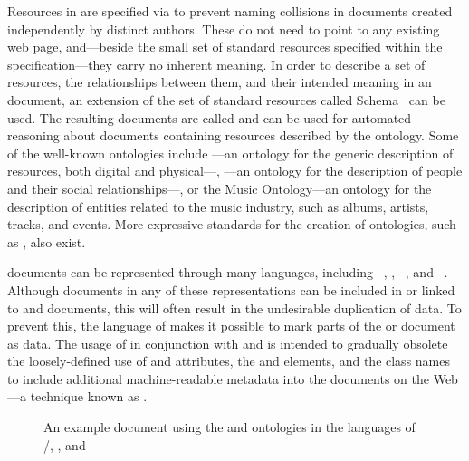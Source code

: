 Resources in  are specified via  to prevent naming
collisions in  documents created independently by distinct authors.
These  do not need to point to any existing web page, and---beside
the small set of standard resources specified within the 
specification---they carry no inherent meaning. In order to describe a set of
resources, the relationships between them, and their intended meaning in an
 document, an extension of the set of standard resources called
 Schema~\cite{brickley04} can be used. The resulting documents
are called   and can be
used for automated reasoning about  documents containing resources
described by the ontology. Some of the well-known ontologies include ---an ontology for the
generic description of resources, both digital and physical---,
---an ontology for the description of people and their social
relationships---, or the Music Ontology---an ontology for the description of
entities related to the music industry, such as albums, artists, tracks, and
events. More expressive standards for the creation of ontologies, such as
, also exist.

 documents can be represented through many languages, including
~\cite{lassira99}, ,
~\cite{beckett14:turtle}, and ~\cite{beckett14:nt}.
Although  documents in any of these representations can be
included in or linked to  and  documents, this
will often result in the undesirable duplication of data. To prevent this, the
language of  makes it possible to mark parts of the
 or  document as  data. The usage
of  in conjunction with  and  is
intended to gradually obsolete the loosely-defined use of  and
 attributes, the  and  elements,
and the  class names to include additional machine-readable metadata
into the documents on the Web---a technique known as .

\begin{figure}
  \vspace{-.4em}%
  \vspace{-.4em}%
  \caption{An example  document using
    the  and  ontologies in the languages of
    /,
    , and
    }\label{fig:rdf-doc}
\end{figure}

